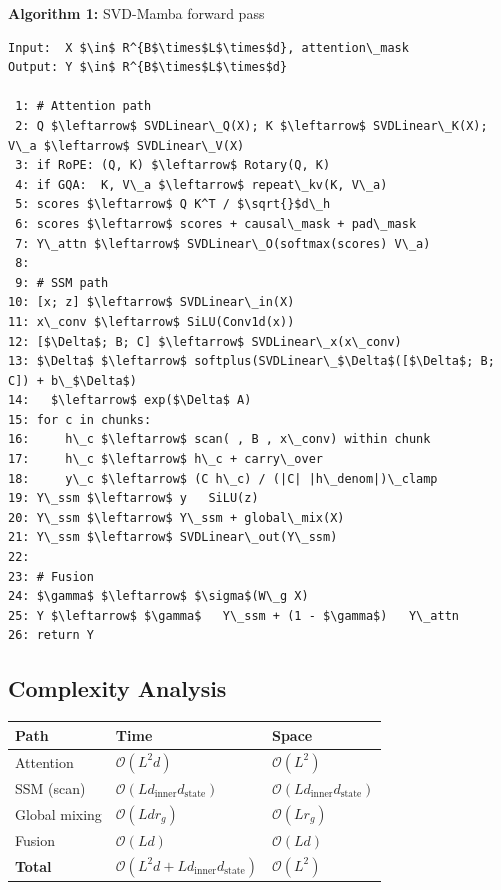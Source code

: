 \textbf{Algorithm 1:} SVD-Mamba forward pass
\begin{lstlisting}
Input:  X $\in$ R^{B$\times$L$\times$d}, attention\_mask
Output: Y $\in$ R^{B$\times$L$\times$d}

 1: # Attention path
 2: Q $\leftarrow$ SVDLinear\_Q(X); K $\leftarrow$ SVDLinear\_K(X); V\_a $\leftarrow$ SVDLinear\_V(X)
 3: if RoPE: (Q, K) $\leftarrow$ Rotary(Q, K)
 4: if GQA:  K, V\_a $\leftarrow$ repeat\_kv(K, V\_a)
 5: scores $\leftarrow$ Q K^T / $\sqrt{}$d\_h
 6: scores $\leftarrow$ scores + causal\_mask + pad\_mask
 7: Y\_attn $\leftarrow$ SVDLinear\_O(softmax(scores) V\_a)
 8:
 9: # SSM path
10: [x; z] $\leftarrow$ SVDLinear\_in(X)
11: x\_conv $\leftarrow$ SiLU(Conv1d(x))
12: [$\Delta$; B; C] $\leftarrow$ SVDLinear\_x(x\_conv)
13: $\Delta$ $\leftarrow$ softplus(SVDLinear\_$\Delta$([$\Delta$; B; C]) + b\_$\Delta$)
14:   $\leftarrow$ exp($\Delta$ A)
15: for c in chunks:
16:     h\_c $\leftarrow$ scan( , B , x\_conv) within chunk
17:     h\_c $\leftarrow$ h\_c + carry\_over
18:     y\_c $\leftarrow$ (C h\_c) / (|C| |h\_denom|)\_clamp
19: Y\_ssm $\leftarrow$ y   SiLU(z)
20: Y\_ssm $\leftarrow$ Y\_ssm + global\_mix(X)
21: Y\_ssm $\leftarrow$ SVDLinear\_out(Y\_ssm)
22:
23: # Fusion
24: $\gamma$ $\leftarrow$ $\sigma$(W\_g X)
25: Y $\leftarrow$ $\gamma$   Y\_ssm + (1 - $\gamma$)   Y\_attn
26: return Y
\end{lstlisting}

\subsection{Complexity Analysis}

\begin{table}[H]
\centering
\small
\begin{tabular}{lll}
\toprule
\textbf{Path} & \textbf{Time} & \textbf{Space} \\
\midrule
Attention & $\mathcal{O}(L^2 d)$ & $\mathcal{O}(L^2)$ \\
SSM (scan) & $\mathcal{O}(L d_\text{inner} d_\text{state})$ & $\mathcal{O}(L d_\text{inner} d_\text{state})$ \\
Global mixing & $\mathcal{O}(L d r_g)$ & $\mathcal{O}(L r_g)$ \\
Fusion & $\mathcal{O}(L d)$ & $\mathcal{O}(L d)$ \\
\textbf{Total} & $\mathcal{O}(L^2 d + L d_\text{inner} d_\text{state})$ & $\mathcal{O}(L^2)$ \\
\bottomrule
\end{tabular}
\end{table}

